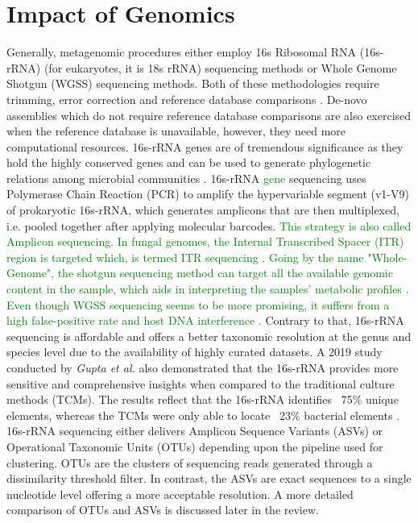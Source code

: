 \section{Impact of Genomics}
Generally, metagenomic procedures either employ 16s Ribosomal RNA (16s-rRNA) (for eukaryotes, it is 18s rRNA) sequencing methods or Whole Genome Shotgun (WGSS) sequencing methods. Both of these methodologies require trimming, error correction and reference database comparisons \cite{ref3}. De-novo assemblies which do not require reference database comparisons are also exercised when the reference database is unavailable, however, they need more computational resources. 16s-rRNA genes are of tremendous significance as they hold the highly conserved genes and can be used to generate phylogenetic relations among microbial communities \cite{ref3}. 16s-rRNA \textcolor{green}{gene} sequencing uses Polymerase Chain Reaction (PCR) to amplify the hypervariable segment (v1-V9) of prokaryotic 16s-rRNA, which generates amplicons that are then multiplexed, i.e. pooled together after applying molecular barcodes. \textcolor{green}{ This strategy is also called Amplicon sequencing. In fungal genomes, the Internal Transcribed Spacer (ITR) region is targeted which, is termed ITR sequencing \cite{ref3}. Going by the name "Whole-Genome", the shotgun sequencing method can target all the available genomic content in the sample, which aids in interpreting the samples' metabolic profiles \cite{ref4}. Even though WGSS sequencing seems to be more promising, it suffers from a high false-positive rate and host DNA interference \cite{ref4}.} Contrary to that, 16s-rRNA sequencing is affordable and offers a better taxonomic resolution at the genus and species level due to the availability of highly curated datasets. A 2019 study conducted by \emph{Gupta et al.} also demonstrated that the 16s-rRNA provides more sensitive and comprehensive insights when compared to the traditional culture methods (TCMs). The results reflect that the 16s-rRNA identifies ~75\% unique elements, whereas the TCMs were only able to locate ~23\% bacterial elements \cite{ref5}. 16s-rRNA sequencing either delivers Amplicon Sequence Variants (ASVs) or Operational Taxonomic Units (OTUs) depending upon the pipeline used for clustering. OTUs are the clusters of sequencing reads generated through a dissimilarity threshold filter. In contrast, the ASVs are exact sequences to a single nucleotide level offering a more acceptable resolution. A more detailed comparison of OTUs and ASVs is discussed later in the review.

